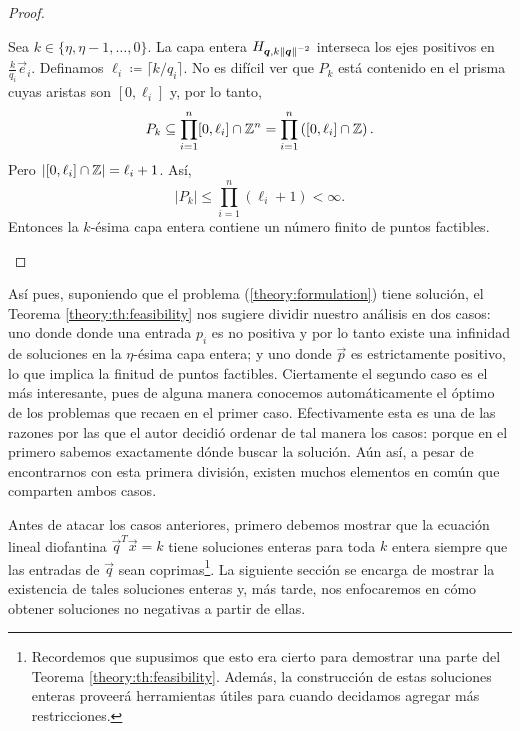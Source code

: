 \begin{proof}
\begin{enumerate}
			Sea $k \in \lbrace \eta, \eta - 1, \ldots, 0 \rbrace$. La capa entera $H_{\boldsymbol{q},
			k\left\lVert \boldsymbol{q} \right\rVert^{-2}}$ interseca los ejes positivos en $\frac{k}{q_i}\vec{e}_i$.
			Definamos $\ell_i \coloneq \lceil k/q_i \rceil$. No es difícil ver que $P_k$ está
			contenido en el prisma cuyas aristas son $[0, \ell_i]$ y, por lo tanto,
			\begin{equation*}
				P_k \subseteq \prod_{i = 1}^{n} [0, \ell_i] \cap \mathbb{Z}^n = \prod_{i = 1}^{n}
				\left( [0, \ell_i] \cap \mathbb{Z} \right).
			\end{equation*}
			Pero $\left| [0, \ell_i] \cap \mathbb{Z} \right| = \ell_i + 1$. Así,
			\begin{equation*}
				|P_k| \leq \prod_{i = 1}^{n} (\ell_i + 1) < \infty.
			\end{equation*}
			Entonces la $k$-ésima capa entera contiene un número finito de puntos factibles.
	\end{enumerate}
\end{proof}

Así pues, suponiendo que el problema (\ref{theory:formulation}) tiene solución, el Teorema
\ref{theory:th:feasibility} nos sugiere dividir nuestro análisis en dos casos: uno donde donde una
entrada $p_i$ es no positiva y por lo tanto existe una infinidad de soluciones en la $\eta$-ésima
capa entera; y uno donde $\vec{p}$ es estrictamente positivo, lo que implica la finitud de puntos
factibles. Ciertamente el segundo caso es el más interesante, pues de alguna manera conocemos
automáticamente el óptimo de los problemas que recaen en el primer caso. Efectivamente esta es una
de las razones por las que el autor decidió ordenar de tal manera los casos: porque en el primero
sabemos exactamente dónde buscar la solución. Aún así, a pesar de encontrarnos con esta primera
división, existen muchos elementos en común que comparten ambos casos.

Antes de atacar los casos anteriores, primero debemos mostrar que la ecuación lineal diofantina
$\vec{q}^T\vec{x} = k$ tiene soluciones enteras para toda $k$ entera siempre que las entradas de
$\vec{q}$ sean coprimas\footnote{
	Recordemos que supusimos que esto era cierto para demostrar una parte del Teorema
	\ref{theory:th:feasibility}. Además, la construcción de estas soluciones enteras proveerá
	herramientas útiles para cuando decidamos agregar más restricciones.
}. La siguiente sección se encarga de mostrar la existencia de tales
soluciones enteras y, más tarde, nos enfocaremos en cómo obtener soluciones no negativas a partir de
ellas.

